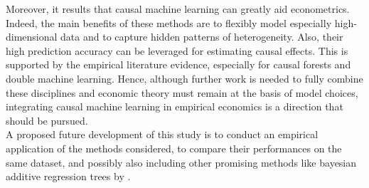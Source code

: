 \documentclass[12pt,a4paper,openright,twoside]{book}
\begin{document}
\begin{doublespacing}
Moreover, it results that causal machine learning can greatly aid econometrics. Indeed, the main benefits of these methods are to flexibly model especially high-dimensional data and to capture hidden patterns of heterogeneity. Also, their high prediction accuracy can be leveraged for estimating causal effects. This is supported by the empirical literature evidence, especially for causal forests and double machine learning. Hence, although further work is needed to fully combine these disciplines and economic theory must remain at the basis of model choices, integrating causal machine learning in empirical economics is a direction that should be pursued. 
\\

A proposed future development of this study is to conduct an empirical application of the methods considered, to compare their performances on the same dataset, and possibly also including other promising methods like bayesian additive regression trees by \citet{hill2011}.

\end{doublespacing}



\end{document}
